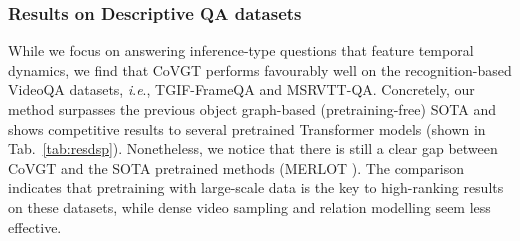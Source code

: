 \documentclass[10pt,journal,compsoc]{IEEEtran}
\newcommand{\ie}{\textit{i}.\textit{e}.}
\begin{document}
\subsubsection{Results on Descriptive QA datasets}
\label{sec:dsp}
While we focus on answering inference-type questions that feature temporal dynamics, we find that CoVGT performs favourably well on the recognition-based VideoQA datasets, \ie, TGIF-FrameQA and MSRVTT-QA. Concretely, our method surpasses the previous object graph-based (pretraining-free) SOTA and shows competitive results to several pretrained Transformer models (shown in Tab.~\ref{tab:resdsp}). Nonetheless, we notice that there is still a clear gap between CoVGT and the SOTA pretrained methods (MERLOT \cite{zellers2021merlot}). The comparison indicates that pretraining with large-scale data is the key to high-ranking results on these datasets, while dense video sampling and relation modelling seem less effective.
\setlength{\tabcolsep}{5pt}
\end{document}
